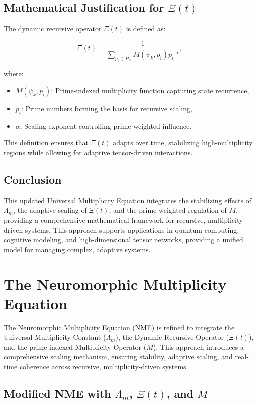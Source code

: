 \documentclass[12pt]{article}
\theoremstyle{plain}
\begin{document}
\subsection{Mathematical Justification for \(\Xi(t)\)}

The dynamic recursive operator \(\Xi(t)\) is defined as:

\[
\Xi(t) = \frac{1}{\sum_{p_i \in P_N} M(\psi_k, p_i) p_i^{-\alpha}},
\]

where:
\begin{itemize}
    \item \( M(\psi_k, p_i) \): Prime-indexed multiplicity function capturing state recurrence,
    \item \( p_i \): Prime numbers forming the basis for recursive scaling,
    \item \( \alpha \): Scaling exponent controlling prime-weighted influence.
\end{itemize}

This definition ensures that \(\Xi(t)\) adapts over time, stabilizing high-multiplicity regions while allowing for adaptive tensor-driven interactions.

\subsection{Conclusion}

This updated Universal Multiplicity Equation integrates the stabilizing effects of \(\Lambda_m\), the adaptive scaling of \(\Xi(t)\), and the prime-weighted regulation of \(M\), providing a comprehensive mathematical framework for recursive, multiplicity-driven systems. This approach supports applications in quantum computing, cognitive modeling, and high-dimensional tensor networks, providing a unified model for managing complex, adaptive systems.

\section{The Neuromorphic Multiplicity Equation}

The Neuromorphic Multiplicity Equation (NME) is refined to integrate the Universal Multiplicity Constant (\(\Lambda_m\)), the Dynamic Recursive Operator (\(\Xi(t)\)), and the prime-indexed Multiplicity Operator (\(M\)). This approach introduces a comprehensive scaling mechanism, ensuring stability, adaptive scaling, and real-time coherence across recursive, multiplicity-driven systems.

\subsection{Modified NME with \(\Lambda_m\), \(\Xi(t)\), and \(M\)}
\end{document}

